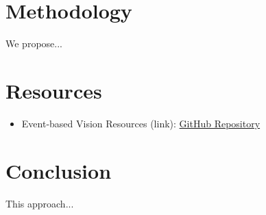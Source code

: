 \documentclass{article}
\begin{document}
\begin{itemize}
    \end{itemize}

\section{Methodology}
We propose...

\section{Resources}
\begin{itemize}
    \item Event-based Vision Resources (link): \href{https://github.com/uzh-rpg/event-based_vision_resources?tab=readme-ov-file#event-based-vision-resources}{GitHub Repository}
\end{itemize}

\section{Conclusion}
This approach...
\end{document}
